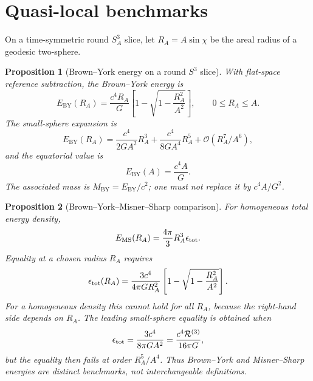 \documentclass[
  aps,
  prd,
  reprint,
  superscriptaddress,
  nofootinbib,
  floatfix,
  longbibliography
]{revtex4-2}
\newtheorem{proposition}{Proposition}
\newcommand{\BY}{\mathrm{BY}}
\newcommand{\MS}{\mathrm{MS}}
\newcommand{\bigO}{\mathcal O}
\begin{document}
\section{Quasi-local benchmarks}
\label{sec:quasi}

On a time-symmetric round \(S^3_A\) slice, let \(R_A=A\sin\chi\) be the areal
radius of a geodesic two-sphere.

\begin{proposition}[Brown--York energy on a round \(S^3\) slice]
\label{prop:BY}
With flat-space reference subtraction, the Brown--York energy is
\begin{equation}
  E_\BY(R_A)=
  \frac{c^4R_A}{G}
  \left[1-\sqrt{1-\frac{R_A^2}{A^2}}\right],
  \qquad 0\le R_A\le A .
  \label{eq:BY}
\end{equation}
The small-sphere expansion is
\begin{equation}
  E_\BY(R_A)=
  \frac{c^4}{2GA^2}R_A^3+
  \frac{c^4}{8GA^4}R_A^5+\bigO(R_A^7/A^6),
  \label{eq:BYsmall}
\end{equation}
and the equatorial value is
\begin{equation}
  E_\BY(A)=\frac{c^4A}{G}.
  \label{eq:BYmax}
\end{equation}
The associated mass is \(M_\BY=E_\BY/c^2\); one must not replace it by
\(c^4A/G^2\).
\end{proposition}

\begin{proposition}[Brown--York--Misner--Sharp comparison]
\label{prop:BYMS}
For homogeneous total energy density,
\begin{equation}
  E_\MS(R_A)=\frac{4\pi}{3}R_A^3\epsilon_{\rm tot}.
\end{equation}
Equality at a chosen radius \(R_A\) requires
\begin{equation}
  \epsilon_{\rm tot}(R_A)=
  \frac{3c^4}{4\pi G R_A^2}
  \left[1-\sqrt{1-\frac{R_A^2}{A^2}}\right].
  \label{eq:eps_BYMS}
\end{equation}
For a homogeneous density this cannot hold for all \(R_A\), because the right-hand
side depends on \(R_A\).  The leading small-sphere equality is obtained when
\begin{equation}
  \epsilon_{\rm tot}=\frac{3c^4}{8\pi GA^2}
  =\frac{c^4\mathcal R^{(3)}}{16\pi G},
\end{equation}
but the equality then fails at order \(R_A^5/A^4\).  Thus Brown--York and
Misner--Sharp energies are distinct benchmarks, not interchangeable definitions.
\end{proposition}
\end{document}
